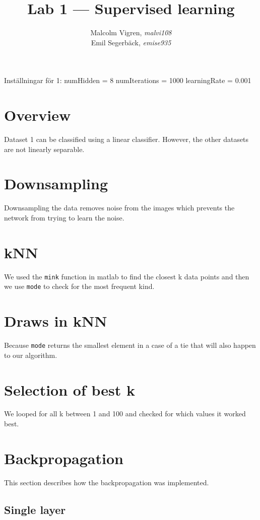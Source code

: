 \documentclass{article}
\begin{document}
\title{Lab 1 --- Supervised learning}
\author{Malcolm Vigren, \textit{malvi108} \\
        Emil Segerbäck, \textit{emise935}}

\maketitle

Inställningar för 1:
numHidden = 8
numIterations = 1000
learningRate = 0.001

\section{Overview}
Dataset 1 can be classified using a linear classifier. However, the
other datasets are not linearly separable.

\section{Downsampling}
Downsampling the data removes noise from the images which prevents the
network from trying to learn the noise.

\section{kNN}
We used the \texttt{mink} function in matlab to find the closest k
data points and then we use \texttt{mode} to check for the most
frequent kind.

\section{Draws in kNN}
Because \texttt{mode} returns the smallest element in a case of a tie
that will also happen to our algorithm.

\section{Selection of best k}
We looped for all k between 1 and 100 and checked for which values it
worked best.

\section{Backpropagation}

This section describes how the backpropagation was implemented.

\subsection{Single layer}
\end{document}
